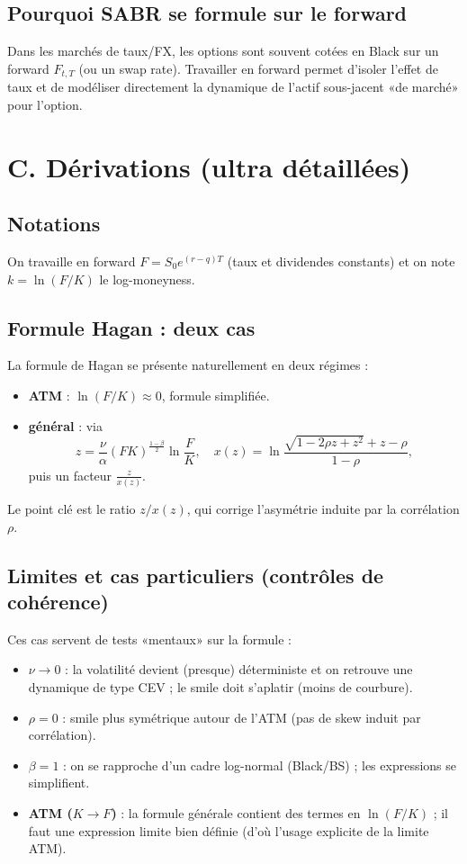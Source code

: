 \documentclass[11pt,a4paper]{report}
\theoremstyle{definition}
\theoremstyle{plain}
\theoremstyle{remark}
\newcommand{\1}{\mathbf{1}}
\begin{document}
\subsection*{Pourquoi SABR se formule sur le forward}
Dans les marchés de taux/FX, les options sont souvent cotées en Black sur un forward $F_{t,T}$ (ou un swap rate).
Travailler en forward permet d'isoler l'effet de taux et de modéliser directement la dynamique de l'actif sous-jacent «de marché» pour l'option.

\section{C. Dérivations (ultra détaillées)}
\subsection*{Notations}
On travaille en forward $F=S_0 e^{(r-q)T}$ (taux et dividendes constants) et on note $k=\ln(F/K)$ le log-moneyness.

\subsection*{Formule Hagan : deux cas}
La formule de Hagan se présente naturellement en deux régimes :
\begin{itemize}[leftmargin=*]
\item \textbf{ATM} : $\ln(F/K)\approx 0$, formule simplifiée.
\item \textbf{général} : via
\[
z=\frac{\nu}{\alpha}(FK)^{\frac{1-\beta}{2}}\ln\frac{F}{K},
\quad
x(z)=\ln\frac{\sqrt{1-2\rho z+z^2}+z-\rho}{1-\rho},
\]
puis un facteur $\frac{z}{x(z)}$.
\end{itemize}
Le point clé est le ratio $z/x(z)$, qui corrige l'asymétrie induite par la corrélation $\rho$.

\subsection*{Limites et cas particuliers (contrôles de cohérence)}
Ces cas servent de tests «mentaux» sur la formule :
\begin{itemize}[leftmargin=*]
\item \textbf{$\nu\to 0$} : la volatilité devient (presque) déterministe et on retrouve une dynamique de type CEV ; le smile doit s'aplatir (moins de courbure).
\item \textbf{$\rho=0$} : smile plus symétrique autour de l'ATM (pas de skew induit par corrélation).
\item \textbf{$\beta=1$} : on se rapproche d'un cadre log-normal (Black/BS) ; les expressions se simplifient.
\item \textbf{ATM ($K\to F$)} : la formule générale contient des termes en $\ln(F/K)$ ; il faut une expression limite bien définie (d'où l'usage explicite de la limite ATM).
\end{itemize}
\end{document}
